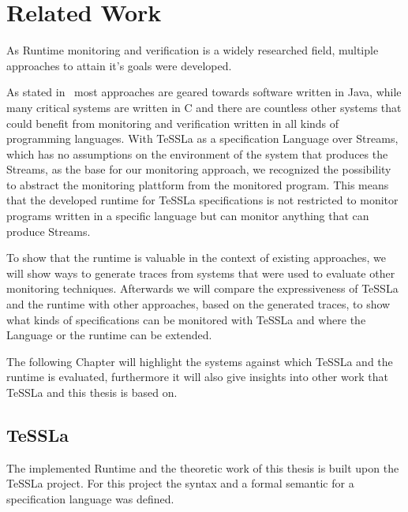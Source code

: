 %
\chapter{Related Work}
\label{sec:related}

As Runtime monitoring and verification is a widely researched field, multiple approaches to attain it's goals were developed.

As stated in~\cite{Havelund2008} most approaches are geared towards software written in Java, while many critical systems are written in C and there are countless other systems that could benefit from monitoring and verification written in all kinds of programming languages.
With TeSSLa as a specification Language over Streams, which has no assumptions on the environment of the system that produces the Streams,  as the base for our monitoring approach, we recognized the possibility to abstract the monitoring plattform from the monitored program.
This means that the developed runtime for TeSSLa specifications is not restricted to monitor programs written in a specific language but can monitor anything that can produce Streams.

To show that the runtime is valuable in the context of existing approaches, we will show ways to generate traces from systems that were used to evaluate other monitoring techniques.
Afterwards we will compare the expressiveness of TeSSLa and the runtime with other approaches, based on the generated traces, to show what kinds of specifications can be monitored with TeSSLa and where the Language or the runtime can be extended.

The following Chapter will highlight the systems against which TeSSLa and the runtime is evaluated, furthermore it will also give insights into other work that TeSSLa and this thesis is based on.

\section{TeSSLa}
\label{sec:related:tessla}

The implemented Runtime and the theoretic work of this thesis is built upon the TeSSLa project.
For this project the syntax and a formal semantic for a specification language was defined.



